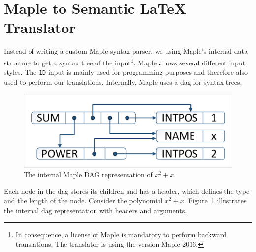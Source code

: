 \documentclass[a4paper,11pt]{article}
\newcommand{\Maple}{Maple}
\theoremstyle{defTheoStyle}
\theoremstyle{defExampStyle}
\begin{document}
 \section{\Maple{} to Semantic \LaTeX{} Translator}\label{sec:backward-translation}
Instead of writing a custom \Maple{} syntax parser, we using \Maple's internal data structure to get a syntax tree of the input\footnote{In consequence, a license of \Maple{} is mandatory to perform backward translations. The translator is using the version \Maple{} 2016.}. \Maple{} allows several different input styles. The \texttt{1D} input is mainly used for programming purposes and therefore also used to perform our translations. Internally, \Maple{} uses a \gls*{dag} for syntax trees.

\begin{figure}
	\vspace{-22pt}
	\centering
	\includegraphics[clip, trim=0.5cm 0.5cm 0.5cm 0.5cm, scale=0.5]{DAGreal.pdf}
	\vspace{-5pt}
	\caption{The internal \Maple{} DAG representation of $x^2+x$.}
	\label{fig:internal-maple-dag}
	\vspace{-15pt}
\end{figure}

Each node in the \gls*{dag} stores its children and has a header, which defines the type and the length of the node. Consider the polynomial $x^2+x$. Figure~\ref{fig:internal-maple-dag} illustrates the internal \gls*{dag} representation with headers and arguments.
\end{document}
